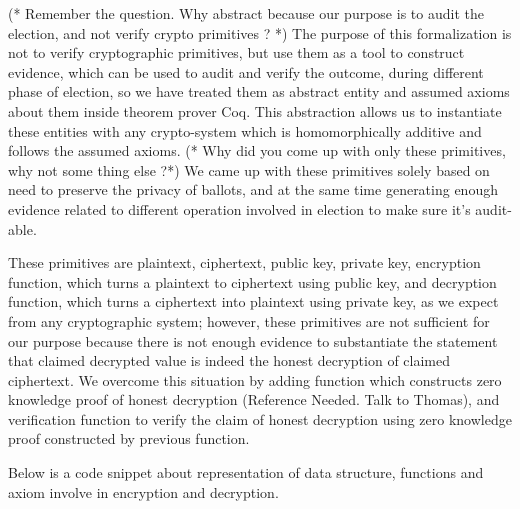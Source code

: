 \documentclass{llncs}
\begin{document}
(* Remember the question. Why abstract because our purpose is to 
   audit the election, and not verify crypto primitives ? *)
The purpose of this formalization is not to verify cryptographic primitives, 
but use them as a tool to construct evidence, which can be used 
to audit and verify the outcome, during different phase 
of election, so we have treated them as abstract entity and assumed 
axioms about them inside theorem prover Coq. This abstraction allows us to
instantiate these entities with any crypto-system which is homomorphically 
additive and follows the assumed axioms. 
(* Why did you come up with only these primitives, why not some thing else ?*)
We came up with these primitives solely based on need to preserve the privacy
of ballots, and at the same time generating enough evidence related to 
different operation involved in election to make sure it's audit-able.


These primitives are plaintext, ciphertext, public key, private key, 
encryption function, which turns a plaintext to ciphertext using 
public key, and decryption function, which turns a ciphertext into 
plaintext using private key, as we expect from any cryptographic system; 
however, these primitives are not sufficient for our purpose because there is 
not enough evidence to substantiate the statement that  
claimed decrypted value is indeed the 
honest decryption of claimed ciphertext. We overcome this situation 
by adding function which constructs zero knowledge proof of honest 
decryption (Reference Needed. Talk to Thomas), and verification 
function to verify the claim of honest decryption using zero 
knowledge proof constructed by previous function. 





Below is a code snippet about representation
of data structure, functions and axiom involve in encryption and decryption.
\end{document}
